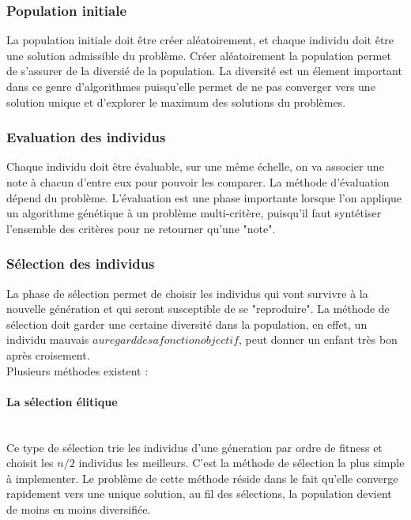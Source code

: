 \documentclass{article}
\begin{document}
		\subsubsection{Population initiale}
		La population initiale doit être créer aléatoirement, et chaque individu doit être une solution admissible du problème. Créer aléatoirement la population permet de s'assurer de la diversié de la population. La diversité est un élement important dans ce genre d'algorithmes puisqu'elle permet de ne pas converger vers une solution unique et d'explorer le maximum des solutions du problèmes.

		\subsubsection{Evaluation des individus}
        Chaque individu doit être évaluable, sur une même échelle, on va associer une note à chacun d'entre eux pour pouvoir les comparer. La méthode d'évaluation dépend du problème. L'évaluation est une phase importante lorsque l'on applique un algorithme génétique à un problème multi-critère, puisqu'il faut syntétiser l'ensemble des critères pour ne retourner qu'une "note".

        \subsubsection{Sélection des individus}
        La phase de sélection permet de choisir les individus qui vont survivre à la nouvelle génération et qui seront susceptible de se "reproduire".
        La méthode de sélection doit garder une certaine diversité dans la population, en effet, un individu mauvais \(au regard de sa fonction objectif\), peut donner un enfant très bon après croisement.
        \\
        Plusieurs méthodes existent :

        \paragraph{La sélection élitique}\mbox{}\\
        Ce type de sélection trie les individus d'une géneration par ordre de fitness et choisit les $n/2$ individus les meilleurs. C'est la méthode de sélection la plus simple à implementer. Le problème de cette méthode réside dans le fait qu'elle converge rapidement vers une unique solution, au fil des sélections, la population devient de moins en moins diversifiée.
\end{document}
